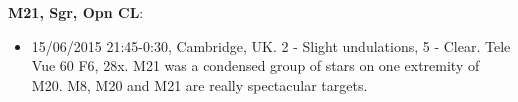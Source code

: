 {\bf M21, Sgr, Opn CL}:
\begin{itemize}
\item 15/06/2015 21:45-0:30, Cambridge, UK. 2 - Slight undulations, 5 - Clear. Tele Vue 60 F6, 28x. M21 was a condensed group of stars on one extremity of M20. M8, M20 and M21 are really spectacular targets.  
\end{itemize}
